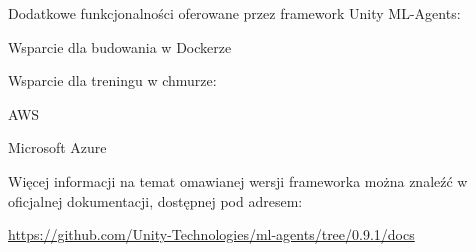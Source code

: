 Dodatkowe funkcjonalności oferowane przez framework Unity ML-Agents:
\begin{enumerate*}
\item Wsparcie dla budowania w Dockerze
\item Wsparcie dla treningu w chmurze:
\begin{itemize*}
\item AWS
\item Microsoft Azure
\end{itemize*}
\end{enumerate*}

Więcej informacji na temat omawianej wersji frameworka można znaleźć w oficjalnej dokumentacji, dostępnej pod adresem:
\begin{center}
\url{https://github.com/Unity-Technologies/ml-agents/tree/0.9.1/docs}
\end{center}

